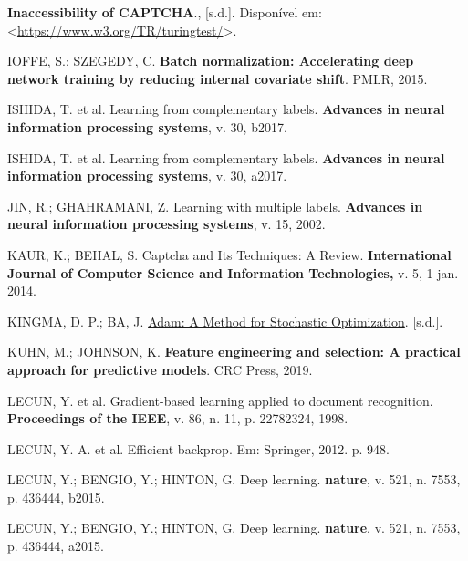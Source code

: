 \documentclass[12pt,twoside,brazilian]{book}
\newlength{\cslhangindent}
\newlength{\cslentryspacingunit} %
\newenvironment{CSLReferences}[2] %
 {%
  \setlength{\parindent}{0pt}
  \ifodd #1
  \let\oldpar\par
  \def\par{\hangindent=\cslhangindent\oldpar}
  \fi
  \setlength{\parskip}{#2\cslentryspacingunit}
 }%
 {}
\begin{document}
\begin{CSLReferences}{0}{1}
\leavevmode{}%
\textbf{Inaccessibility of CAPTCHA}., {[}s.d.{]}. Disponível em:
\textless{}\url{https://www.w3.org/TR/turingtest/}\textgreater.

\leavevmode{}%
IOFFE, S.; SZEGEDY, C. \textbf{Batch normalization: Accelerating deep
network training by reducing internal covariate shift}. PMLR, 2015.

\leavevmode{}%
ISHIDA, T. et al. Learning from complementary labels. \textbf{Advances
in neural information processing systems}, v. 30, b2017.

\leavevmode{}%
ISHIDA, T. et al. Learning from complementary labels. \textbf{Advances
in neural information processing systems}, v. 30, a2017.

\leavevmode{}%
JIN, R.; GHAHRAMANI, Z. Learning with multiple labels. \textbf{Advances
in neural information processing systems}, v. 15, 2002.

\leavevmode{}%
KAUR, K.; BEHAL, S. Captcha and Its Techniques: A Review.
\textbf{International Journal of Computer Science and Information
Technologies,} v. 5, 1 jan. 2014.

\leavevmode{}%
KINGMA, D. P.; BA, J.
\href{https://doi.org/10.48550/arXiv.1412.6980}{Adam: A Method for
Stochastic Optimization}. {[}s.d.{]}.

\leavevmode{}%
KUHN, M.; JOHNSON, K. \textbf{Feature engineering and selection: A
practical approach for predictive models}. CRC Press, 2019.

\leavevmode{}%
LECUN, Y. et al. Gradient-based learning applied to document
recognition. \textbf{Proceedings of the IEEE}, v. 86, n. 11, p.
22782324, 1998.

\leavevmode{}%
LECUN, Y. A. et al. Efficient backprop. Em: Springer, 2012. p. 948.

\leavevmode{}%
LECUN, Y.; BENGIO, Y.; HINTON, G. Deep learning. \textbf{nature}, v.
521, n. 7553, p. 436444, b2015.

\leavevmode{}%
LECUN, Y.; BENGIO, Y.; HINTON, G. Deep learning. \textbf{nature}, v.
521, n. 7553, p. 436444, a2015.


\end{CSLReferences}
\end{document}
